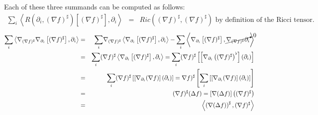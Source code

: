 \documentclass{article}
\begin{document}
Each of these three summands can be computed as follows:
\begin{eqnarray*}
\displaystyle{\sum_i} \left\langle R( \partial_i , (\nabla f)^\sharp ) \left[  (\nabla f) ^\sharp \right] , \partial_i \right\rangle & = & Ric \left( (\nabla f)^\sharp, (\nabla f)^\sharp \right) \mbox{ by definition of the Ricci tensor.}
\end{eqnarray*}
\begin{eqnarray*}
\displaystyle{\sum_i} \left\langle \nabla _{(\nabla f)^\sharp} \nabla _{\partial_i} \left[  (\nabla f) ^\sharp \right] , \partial_i \right\rangle &
 = & \displaystyle{\sum_i} \nabla _{(\nabla f)^\sharp}  \left\langle \nabla _{\partial_i} \left[  (\nabla f) ^\sharp \right] , \partial_i \right\rangle
 - \displaystyle{\sum_i} \left\langle  \nabla _{\partial_i} \left[  (\nabla f) ^\sharp \right] , \cancelto{0}{\nabla _{(\nabla f)^\sharp} \partial_i} \right\rangle \\
 & = & \displaystyle{\sum_i} (\nabla f)^\sharp  \left\langle \nabla _{\partial_i} \left[  (\nabla f) ^\sharp \right] , \partial_i \right\rangle
 = \displaystyle{\sum_i} (\nabla f)^\sharp  \left[ \left[ \nabla _{\partial_i}  \left((\nabla f) ^\sharp\right) ^\flat \right] \left( \partial_i \right) \right] \\
 & = & \displaystyle{\sum_i} (\nabla f)^\sharp  \left[ \left[ \nabla _{\partial_i}  (\nabla f)  \right] \left( \partial_i \right) \right]
 = \nabla f)^\sharp \left[ \displaystyle{\sum_i}  \left[ \left[ \nabla _{\partial_i}  (\nabla f)  \right] \left( \partial_i \right) \right] \right]\\
 & = & (\nabla f)^\sharp (\Delta f) = \left[ \nabla (\Delta f ) \right] \left( (\nabla f )^\sharp \right) \\
 & = & \left\langle \left( \nabla (\Delta f) \right)^\sharp , (\nabla f)^\sharp \right\rangle
\end{eqnarray*}
\end{document}
